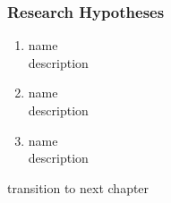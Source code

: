 \subsubsection{Research Hypotheses} %
\label{ssub:research_hypotheses}

\begin{enumerate}
    \item name \\
    description
    \item name \\
    description
    \item name \\
    description
\end{enumerate}



\vspace{2em}
transition to next chapter

